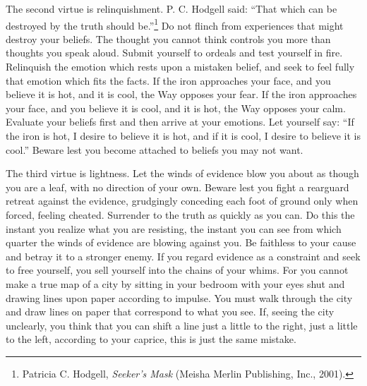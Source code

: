  The second virtue is relinquishment. P. C. Hodgell said:
``That which can be destroyed by the truth should
be.''\footnote{Patricia C. Hodgell, \textit{Seeker's Mask}
(Meisha Merlin Publishing, Inc., 2001).} Do not flinch from
experiences that might destroy your beliefs. The thought you cannot
think controls you more than thoughts you speak aloud. Submit yourself
to ordeals and test yourself in fire. Relinquish the emotion which
rests upon a mistaken belief, and seek to feel fully that emotion which
fits the facts. If the iron approaches your face, and you believe it is
hot, and it is cool, the Way opposes your fear. If the iron approaches
your face, and you believe it is cool, and it is hot, the Way opposes
your calm. Evaluate your beliefs first and then arrive at your
emotions. Let yourself say: ``If the iron is hot, I
desire to believe it is hot, and if it is cool, I desire to believe it
is cool.'' Beware lest you become attached to beliefs
you may not want.

\label{third_virtue}

 The third virtue is lightness. Let the winds of evidence blow you
about as though you are a leaf, with no direction of your own. Beware
lest you fight a rearguard retreat against the evidence, grudgingly
conceding each foot of ground only when forced, feeling cheated.
Surrender to the truth as quickly as you can. Do this the instant you
realize what you are resisting, the instant you can see from which
quarter the winds of evidence are blowing against you. Be faithless to
your cause and betray it to a stronger enemy. If you regard evidence as
a constraint and seek to free yourself, you sell yourself into the
chains of your whims. For you cannot make a true map of a city by
sitting in your bedroom with your eyes shut and drawing lines upon
paper according to impulse. You must walk through the city and draw
lines on paper that correspond to what you see. If, seeing the city
unclearly, you think that you can shift a line just a little to the
right, just a little to the left, according to your caprice, this is
just the same mistake.


